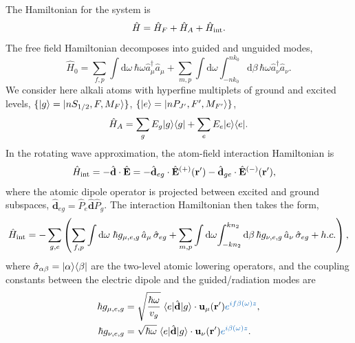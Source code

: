 \documentclass[preprint,aps,pra,onecolumn]{revtex4-1} %
\newcommand{\inter}{{\rm int}}
\newcommand{\change}[1]{{\color{RoyalBlue} #1}}
\begin{document}
The Hamiltonian for the system is
\begin{equation}
\hat{H} = \hat{H}_F+\hat{H}_A + \hat{H}_{\inter}.
\end{equation}
The free field Hamiltonian decomposes into guided and unguided modes, 
\begin{equation}
\hat{H}_0 = \sum_{f,p}\int \mathrm{d}\omega \, \hbar \omega \hat{a}^\dagger_\mu \hat{a}_\mu 
+\sum_{m,p} \int \mathrm{d}\omega  \int_{-nk_0}^{nk_0} \mathrm{d}\beta \, \hbar \omega 
\hat{a}^\dagger_\nu \hat{a}_\nu.
\end{equation}
We consider here alkali atoms with hyperfine multiplets of ground and excited levels, $\{ 
\lvert{g}\rangle=\lvert{nS_{1/2}, F, M_F}\rangle\}$, $\{ \lvert{e}\rangle =\lvert{nP_{J'}, F', M_{F'}}\rangle\}$,
\begin{equation}
\hat{H}_A  = \sum_g E_g \lvert{g}\rangle\langle{g}\rvert + \sum_e E_e \lvert{e}\rangle\langle{e}\rvert.
\end{equation}
In the rotating wave approximation, the atom-field interaction Hamiltonian is
\begin{align}
\hat{H}_{\inter} &= -\hat{\mathbf{d}}\cdot \hat{\mathbf{E}} = -\hat{\mathbf{d}}_{eg}\cdot 
\hat{\mathbf{E}}^{(+)}(\br')-\hat{\mathbf{d}}_{ge}\cdot \hat{\mathbf{E}}^{(-)}(\br'),
\end{align}
where the atomic dipole operator is projected between excited and ground subspaces, $\hat{\mathbf{d}}_{eg}= \hat{P}_e \hat{\mathbf{d}} \hat{P}_g $. The interaction Hamiltonian then takes the form, 
\begin{equation}
\hat{H}_{\inter} = -\sum_{g,e} \left(\sum_{f,p} \int\mathrm{d}\omega \; \hbar g_{\mu, e,g}\, \hat{a}_\mu  \, 
\hat{\sigma}_{eg}+ \sum_{m,p} \int\mathrm{d}\omega \! \int_{-kn_2}^{kn_2}\mathrm{d}\beta \,  \hbar 
g_{\nu, e,g}\, \hat{a}_\nu \, \hat{\sigma}_{eg}+  h.c.\right),
\end{equation}
where $\hat{\sigma}_{\alpha\beta}= \lvert{\alpha}\rangle\langle{\beta}\rvert$ are the two-level atomic lowering operators, and 
the coupling constants between the electric dipole and the guided/radiation modes are
\begin{subequations} \label{Eq::CouplingConstants}
\begin{align}
\hbar g_{\mu, e,g} &= \sqrt{\frac{\hbar \omega}{v_g}}\; \bra{e} \hat{\mathbf{d}} \ket{g} 
\cdot\mathbf{u}_\mu (\br') \change{  e^{i f \beta(\omega)z} }, \\
\hbar g_{\nu, e,g} &= \sqrt{\hbar \omega} \; \bra{e} \hat{\mathbf{d}} \ket{g} \cdot \mathbf{u}_\nu (\br')  \change{  e^{i\beta(\omega)z} } .
\end{align}
\end{subequations}
\end{document}

